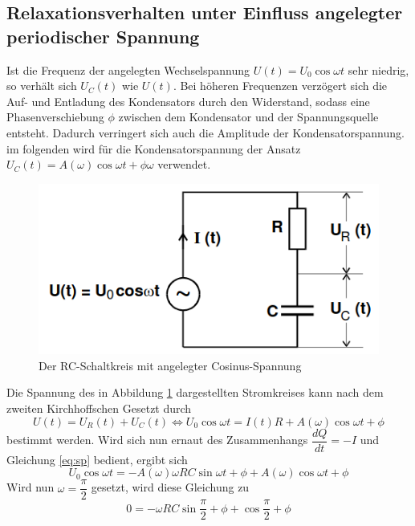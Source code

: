 \subsection{Relaxationsverhalten unter Einfluss angelegter periodischer Spannung}
    Ist die Frequenz der angelegten Wechselspannung $U(t)=U_0\cos{\omega t}$ sehr niedrig,
    so verhält sich $U_C(t)$ wie $U(t)$. Bei höheren Frequenzen verzögert sich 
    die Auf- und Entladung des Kondensators durch den Widerstand, sodass eine 
    Phasenverschiebung $\phi$ zwischen dem Kondensator und der Spannungsquelle 
    entsteht. Dadurch verringert sich auch die Amplitude der Kondensatorspannung.
    im folgenden wird für die Kondensatorspannung der Ansatz $U_C(t)=A(\omega)
    \cos{\omega t + \phi{\omega}}$ verwendet.
    \begin{figure}[H]
        \centering
        \includegraphics{schalt3.png}
        \caption{Der RC-Schaltkreis mit angelegter Cosinus-Spannung}
        \label{fig:schalt3}
    \end{figure}
    Die Spannung des in Abbildung \ref{fig:schalt3} dargestellten Stromkreises kann nach dem zweiten
    Kirchhoffschen Gesetzt durch 
    \begin{equation}
        \label{eq:kirsche}
        U(t)=U_R(t)+U_C(t) \Leftrightarrow U_0 \cos{\omega t}=I(t)R + 
        A(\omega)\cos{\omega t + \phi}
    \end{equation}
    bestimmt werden. Wird sich nun ernaut des Zusammenhangs $\dfrac{dQ}{dt}=-I$ und 
    Gleichung \ref{eq:sp} bedient, ergibt sich
    \begin{equation}
        U_0\cos{\omega t}=-A(\omega)\omega RC \sin{\omega t+\phi}+A(\omega)\cos{\omega t + \phi}
    \end{equation}
    Wird nun $\omega=\dfrac{\pi}{2}$ gesetzt, wird diese Gleichung zu 
    \begin{equation*}
        0 = -\omega RC \sin{\dfrac{\pi}{2} + \phi}+\cos{\dfrac{\pi}{2}+\phi}
    \end{equation*}
